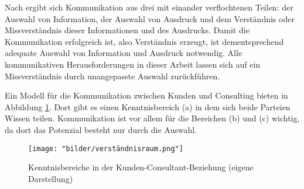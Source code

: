 \documentclass[../main.tex]{subfiles}
\begin{document}
Nach \textcite{luhmann1992communication} ergibt sich Kommunikation aus drei mit einander verflochtenen Teilen: der Auswahl von Information, der Auswahl von Ausdruck und dem Verständnis oder Missverständnis dieser Informationen und des Ausdrucks.
Damit die Kommunikation erfolgreich ist, also Verständnis erzeugt, ist dementsprechend adequate Auswahl von Information und Ausdruck notwendig.
Alle kommunikativen Herausforderungen in dieser Arbeit lassen sich auf ein Missverständnis durch unangepasste Auswahl zurückführen.

Ein Modell für die Kommunikation zwischen Kunden und Consulting bieten \textcite{davis2006communication} in Abbildung \ref{fig:kenntnisbereich}.
Dort gibt es einen Kenntnisbereich (a) in dem sich beide Parteien Wissen teilen.
Kommunikation ist vor allem für die Bereichen (b) und (c) wichtig, da dort das Potenzial besteht nur durch die Auswahl.
\begin{figure}[ht]
    \centering
    \texttt{[image: "bilder/verständnisraum.png"]}
    \caption{Kenntnisbereiche in der Kunden-Consultant-Beziehung (eigene Darstellung)}
    \label{fig:kenntnisbereich}
\end{figure}
\end{document}
